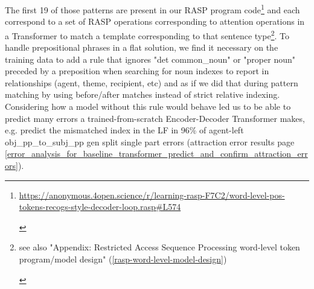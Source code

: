 \documentclass[11pt]{article}
\begin{document}
The first 19 of those patterns are present in our RASP program code\footnote{\begin{footnotesize}\href{https://anonymous.4open.science/r/learning-rasp-F7C2/word-level-pos-tokens-recogs-style-decoder-loop.rasp\#L574}{https://anonymous.4open.science/r/learning-rasp-F7C2/word-level-pos-tokens-recogs-style-decoder-loop.rasp\#L574}\end{footnotesize}}
and each correspond to a set of RASP operations corresponding to attention operations in a Transformer to match a template corresponding to that sentence type\footnote{\begin{footnotesize}see also "Appendix: Restricted Access Sequence Processing word-level token program/model design" (\ref{rasp-word-level-model-design})\end{footnotesize}}.
To handle prepositional phrases in a flat solution, we find it necessary on the training data to add a rule that ignores "det common\_noun" or "proper noun" preceded by a preposition when searching for noun indexes to report in relationships (agent, theme, recipient, etc) and as if we did that during pattern matching by using before/after matches instead of strict relative indexing. Considering how a model without this rule would behave led us to be able to predict many errors a trained-from-scratch Encoder-Decoder Transformer makes, e.g. predict the mismatched index in the LF in 96\% of agent-left obj\_pp\_to\_subj\_pp gen split single part errors (attraction error results page \ref{error_analysis_for_baseline_transformer_predict_and_confirm_attraction_errors}).
\end{document}
